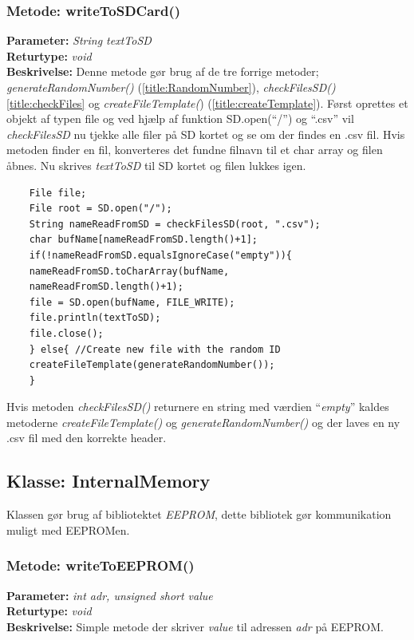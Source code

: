 \subsubsection{Metode: writeToSDCard()}
\textbf{Parameter: } \textit{String textToSD}
\\ \textbf{Returtype: } \textit{void}
\\ \textbf{Beskrivelse: }  Denne metode gør brug af de tre forrige metoder; \textit{generateRandomNumber()} (\ref{title:RandomNumber}), \textit{checkFilesSD()} \ref{title:checkFiles} og \textit{createFileTemplate(}) (\ref{title:createTemplate}). Først oprettes et objekt af typen file og ved hjælp af funktion SD.open(“/”) og “.csv” vil \textit{checkFilesSD} nu tjekke alle filer på SD kortet og se om der findes en .csv fil. Hvis metoden finder en fil, konverteres det fundne filnavn til et char array og filen åbnes. Nu skrives \textit{textToSD} til SD kortet og filen lukkes igen. 
\begin{lstlisting}
	File file;
	File root = SD.open("/");
	String nameReadFromSD = checkFilesSD(root, ".csv");
	char bufName[nameReadFromSD.length()+1]; 
	if(!nameReadFromSD.equalsIgnoreCase("empty")){ 
	nameReadFromSD.toCharArray(bufName,
	nameReadFromSD.length()+1); 
	file = SD.open(bufName, FILE_WRITE);
	file.println(textToSD);
	file.close();
	} else{ //Create new file with the random ID
	createFileTemplate(generateRandomNumber());
	}
\end{lstlisting}
Hvis metoden \textit{checkFilesSD()} returnere en string med værdien “\textit{empty}” kaldes metoderne \textit{createFileTemplate()} og \textit{generateRandomNumber()} og der laves en ny .csv fil med den korrekte header. 

\subsection{Klasse: InternalMemory}
Klassen gør brug af bibliotektet \textit{EEPROM}, dette bibliotek gør kommunikation muligt med EEPROMen. 

\subsubsection{Metode: writeToEEPROM()}
\textbf{Parameter: } \textit{int adr, unsigned short value}
\\ \textbf{Returtype: } \textit{void}
\\ \textbf{Beskrivelse: }  Simple metode der skriver \textit{value} til adressen \textit{adr} på EEPROM.

